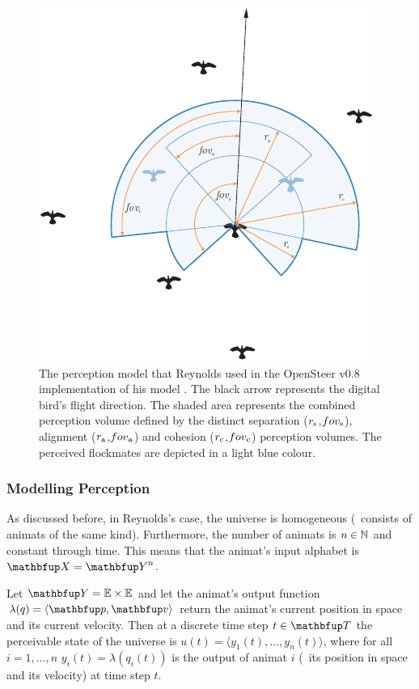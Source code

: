 \begin{figure}%
\includegraphics{fig[perception]cwr}
\caption{The perception model that Reynolds used in the OpenSteer v0.8 implementation of his model \cite{reynolds:1999}. The black arrow represents the digital bird's flight direction. The shaded area represents the combined perception volume defined by the distinct separation ($r_\textnormal{s}$,$fov_\textnormal{s}$), alignment ($r_\textnormal{a}$,$fov_\textnormal{a}$) and cohesion ($r_\textnormal{c}$,$fov_\textnormal{c}$) perception volumes. The perceived flockmates are depicted in a light blue colour.}
\label{fig:perception:cwr}
\end{figure}

\subsubsection{Modelling Perception}
As discussed before, in Reynolds's case, the universe is homogeneous (\ie\ consists of animats of the same kind). Furthermore, the number of animats is $n \in \mathbb{N}$ and constant through time. This means that the animat's input alphabet is $\set{X}=\set{Y}^n$. 

Let $\set{Y}=\E \times \E$ and let the animat's output function $\lambda(q)=\langle\vect{p},\vect{v}\rangle$ return the animat's current position in space and its current velocity. Then at a discrete time step $t \in \set{T}$ the perceivable state of the universe is $u(t)=\langle y_1(t),\ldots,y_n(t)\rangle$, where for all $i=1,\ldots,n$ $y_i(t)=\lambda(q_i(t))$ is the output of animat $i$ (\ie\ its position in space and its velocity) at time step $t$. 

